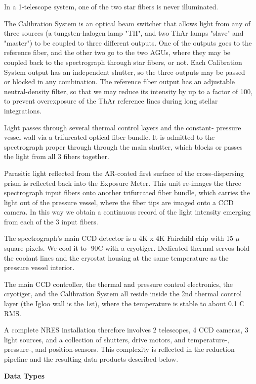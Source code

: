 In a 1-telescope system, one of the two star fibers is never illuminated.

The Calibration System is an optical beam switcher that allows 
light from any of three sources (a tungsten-halogen lamp "TH", and two
ThAr lamps "slave" and "master") to be coupled to three different outputs.  
One of
the outputs goes to the reference fiber, and the other two go to the two
AGUs, where they may be coupled back to the spectrograph through star fibers,
or not.
Each Calibration System output has an independent shutter, so the three 
outputs may be passed or blocked in any combination.
The reference fiber output has an adjustable neutral-density filter, so that
we may reduce its intensity by up to a factor of 100, to prevent
overexposure of the ThAr reference lines during long stellar integrations.

Light passes through several thermal control layers and the constant-
pressure vessel wall via a trifurcated optical fiber bundle.
It is admitted to the spectrograph proper through through the main shutter,
which blocks or passes the light from all 3 fibers together.

Parasitic light reflected from the AR-coated first surface of the 
cross-dispersing prism is reflected back into the Exposure Meter.
This unit re-images the three spectrograph input fibers onto
another trifurcated fiber bundle, which carries the light out of the
pressure vessel, where the fiber tips are imaged onto a CCD camera.
In this way we obtain a continuous record of the light intensity emerging
from each of the 3 input fibers.

The spectrograph's main CCD detector is a 4K x 4K Fairchild chip with 15 $\mu$
square pixels.  We cool it to -90C with a cryotiger.  Dedicated thermal servos
hold the coolant lines and the cryostat housing at the same temperature as
the pressure vessel interior.

The main CCD controller, the thermal and pressure control electronics,
the cryotiger, and the Calibration System all reside inside the 2nd thermal
control layer (the Igloo wall is the 1st), where the temperature is stable
to about 0.1 C RMS.

A complete NRES installation therefore involves 2 telescopes, 4 CCD cameras,
3 light sources, and a collection of shutters, drive motors, and temperature-,
pressure-, and position-sensors.  This complexity is reflected in the
reduction pipeline and the resulting data products described below.

\vskip12pt
\parindent=0pt
{\bf{Data Types}}
\vskip8pt
\parindent20pt

